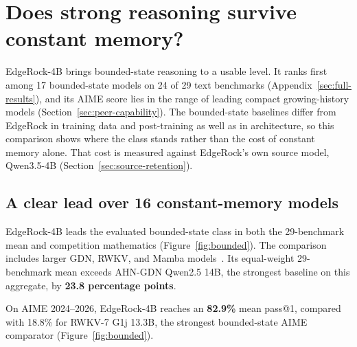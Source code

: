 \section{Does strong reasoning survive constant memory?}
\label{sec:capability}
EdgeRock-4B brings bounded-state reasoning to a usable level. It ranks first among 17 bounded-state models on 24 of 29 text benchmarks (Appendix~\ref{sec:full-results}), and its AIME score lies in the range of leading compact growing-history models (Section~\ref{sec:peer-capability}). The bounded-state baselines differ from EdgeRock in training data and post-training as well as in architecture, so this comparison shows where the class stands rather than the cost of constant memory alone. That cost is measured against EdgeRock's own source model, Qwen3.5-4B (Section~\ref{sec:source-retention}).

\subsection{A clear lead over 16 constant-memory models}
\label{sec:bounded-capability}
EdgeRock-4B leads the evaluated bounded-state class in both the 29-benchmark mean and competition mathematics (Figure~\ref{fig:bounded}). The comparison includes larger GDN, RWKV, and Mamba models~\cite{ahn,rwkvg1,falcon3}. Its equal-weight 29-benchmark mean exceeds AHN-GDN Qwen2.5 14B, the strongest baseline on this aggregate, by \textbf{23.8 percentage points}.

On AIME 2024--2026, EdgeRock-4B reaches an \textbf{82.9\%} mean pass@1, compared with 18.8\% for RWKV-7 G1j 13.3B, the strongest bounded-state AIME comparator (Figure~\ref{fig:bounded}).
